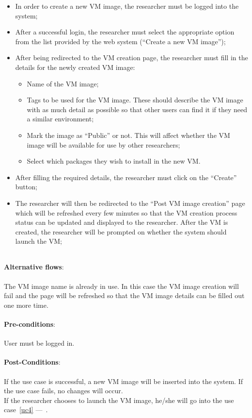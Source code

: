 \begin{itemize}
\item In order to create a new VM image, the researcher must be logged into the system;
\item After a successful login, the researcher must select the appropriate option from the list provided by the web system (``Create a new VM image'');
\item After being redirected to the VM creation page, the researcher must fill in the details for the newly created VM image:
	\begin{itemize}
	\item Name of the VM image;
	\item Tags to be used for the VM image. These should describe the VM image with as much detail as possible so that other users can find it if they need a similar environment;
	\item Mark the image as ``Public'' or not. This will affect whether the VM image will be available for use by other researchers;
	\item Select which packages they wish to install in the new VM.
	\end{itemize}
\item After filling the required details, the researcher must click on the ``Create'' button;
\item The researcher will then be redirected to the ``Post VM image creation'' page which will be refreshed every few minutes so that the VM creation process status can be updated and displayed to the researcher. After the VM is created, the researcher will be prompted on whether the system should launch the VM;
\end{itemize}

\ \\
\textbf{Alternative flows}:\\
\ \\
The VM image name is already in use. In this case the VM image creation will fail and the page will be refreshed so that the VM image details can be filled out one more time.\\
\ \\
\textbf{Pre-conditions}:\\
\ \\
User must be logged in.\\
\ \\
\textbf{Post-Conditions}:\\
\ \\
If the use case is successful, a new VM image will be inserted into the system. If the use case fails, no changes will occur.\\
If the researcher chooses to launch the VM image, he/she will go into the use case~\ref{uc4} ---~.\\

